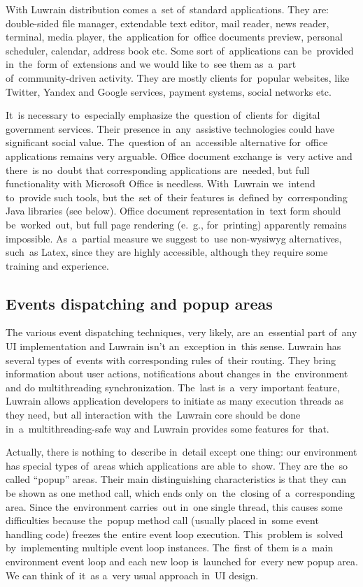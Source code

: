 \documentclass{acm_proc_article-sp}
\begin{document}
With Luwrain distribution comes a~set of~standard applications.
They are: 
double-sided file manager,
extendable text editor,
mail reader,
news reader,
terminal,
media player,
the~application for~office documents preview,
personal scheduler,
calendar,
address book etc.
Some sort of~applications can be~provided in~the~form of~extensions
and we would like to~see them as~a~part of~community-driven activity.
They are mostly clients for~popular websites, like 
Twitter,
Yandex and Google services,
payment systems, 
social networks etc.

It~is necessary to~especially emphasize the~question of~clients 
for~digital government services.
Their presence in~any~assistive  technologies could have significant social value.
The~question of~an~accessible alternative for~office applications remains very arguable.
Office document exchange is~very active and 
there~is no~doubt that corresponding applications are~needed,
but full functionality with Microsoft Office is needless.
With~Luwrain we~intend to~provide such tools, 
but the~set of~their features is~defined by~corresponding Java libraries (see below).
Office document representation in~text form should be~worked~out, 
but full page rendering (e.~g., for~printing) apparently remains impossible.
As~a~partial measure we suggest to~use non-wysiwyg alternatives, such~as Latex, since they are highly accessible,
 although they require some training and experience. 

\subsection{Events dispatching and popup areas}

The various event dispatching techniques, very likely, are an~essential part of~any UI implementation
and Luwrain isn't an~exception in~this sense.
Luwrain has several types of~events with corresponding rules of~their routing.
They bring information about user actions,
notifications about changes in~the~environment and 
do multithreading synchronization.
The~last is~a~very important feature,
Luwrain allows application developers to initiate as many execution threads as they need, 
but all interaction with~the~Luwrain core should be done in~a~multithreading-safe way
and Luwrain provides some features for~that.

Actually, there is nothing  to~describe in~detail 
except one thing: our environment has special types of~areas which applications are able to~show.
They are the~so called ``popup'' areas.
Their main distinguishing characteristics  is that they can be shown as one method call, 
which ends only on~the~closing of~a~corresponding area.
Since the~environment carries~out in~one single thread, 
this causes some difficulties because the~popup method call (usually placed in~some event handling code)
freezes the~entire event loop execution.
This~problem is~solved by~implementing multiple event loop instances.
The~first of~them is a~main environment event loop and each new loop is~launched for~every new popup area.
We can think of~it~as a~very usual approach in~UI design.
\end{document}
